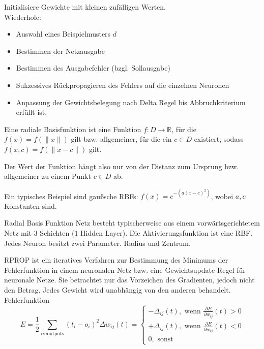 Initialisiere Gewichte mit kleinen zufälligen Werten.\\

Wiederhole:
\begin{itemize}
    \item Auswahl eines Beispielmusters $d$
    \item Bestimmen der Netzausgabe
    \item Bestimmen des Ausgabefehler (bzgl. Sollausgabe)
    \item Sukzessives Rückpropagieren des Fehlers auf die einzelnen Neuronen
    \item Anpassung der Gewichtsbelegung nach Delta Regel bis Abbruchkriterium
    erfüllt ist.
\end{itemize}

Eine radiale Basisfunktion ist eine Funktion $f: D \rightarrow \mathbb{R}$,
für die $f(x) = f(\|x\|)$ gilt bzw. allgemeiner, für die ein $c \in D$
existiert, sodass $f(x, c) = f(\|x - c\|)$ gilt.

Der Wert der Funktion hängt also nur von der Distanz zum Ursprung bzw.
allgemeiner zu einem Punkt $c \in D$ ab.

Ein typisches Beispiel sind gaußsche RBFs:
$f(x) = e^{-(a (x - c)^2)}$, wobei $a, c$ Konstanten sind.

Radial Basis Funktion Netz besteht typischerweise aus einem vorwärtsgerichtetem Netz
mit 3 Schichten (1 Hidden Layer). Die Aktivierungsfunktion ist eine RBF. Jedes Neuron
besitzt zwei Parameter. Radius und Zentrum.

RPROP ist ein iteratives Verfahren zur Bestimmung des Minimums der
Fehlerfunktion in einem neuronalen Netz bzw. eine Gewichtsupdate-Regel
für neuronale Netze. Sie betrachtet nur das Vorzeichen des Gradienten,
jedoch nicht den Betrag. Jedes Gewicht wird unabhängig von den anderen behandelt.\\

Fehlerfunktion
\begin{displaymath}
    E = \frac{1}{2} \sum_{i in \text{outputs}}(t_i -o_i)^2
\Delta w_{ij}(t)= \begin{cases}
-\Delta_{ij}(t), \text{ wenn } \frac{\partial E}{\partial w_{ij}}(t) > 0 \\
+\Delta_{ij}(t), \text{ wenn }\frac{\partial E}{\partial w_{ij}}(t) < 0 \\
0, \text{ sonst}
\end{cases}
\end{displaymath}


